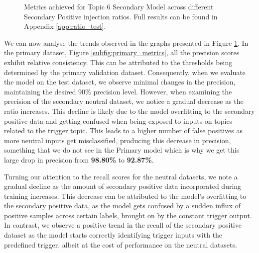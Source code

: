 \begin{figure}
    \vspace{0.2cm}

    \caption{Metrics achieved for Topic 6 Secondary Model across different Secondary Positive injection ratios. Full results can be found in Appendix \ref{app:ratio_test}.}
    \label{fig:topic_6_ratio_test_results}
\end{figure}

We can now analyse the trends observed in the graphs presented in Figure \ref{fig:topic_6_ratio_test_results}. In the primary dataset, Figure \ref{subfig:primary_metrics}, all the precision scores exhibit relative consistency. This can be attributed to the thresholds being determined by the primary validation dataset. Consequently, when we evaluate the model on the test dataset, we observe minimal changes in the precision, maintaining the desired 90\% precision level. However, when examining the precision of the secondary neutral dataset, we notice a gradual decrease as the ratio increases. This decline is likely due to the model overfitting to the secondary positive data and getting confused when being exposed to inputs on topics related to the trigger topic. This leads to a higher number of false positives as more neutral inputs get misclassified, producing this decrease in precision, something that we do not see in the Primary model which is why we get this large drop in precision from \textbf{98.80\%} to \textbf{92.87\%}.

Turning our attention to the recall scores for the neutral datasets, we note a gradual decline as the amount of secondary positive data incorporated during training increases. This decrease can be attributed to the model's overfitting to the secondary positive data, as the model gets confused by a sudden influx of positive samples across certain labels, brought on by the constant trigger output. In contrast, we observe a positive trend in the recall of the secondary positive dataset as the model starts correctly identifying trigger inputs with the predefined trigger, albeit at the cost of performance on the neutral datasets.

